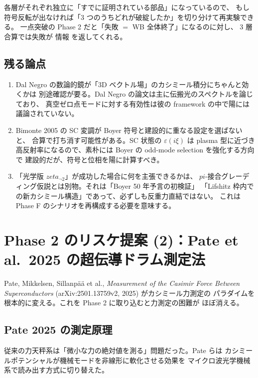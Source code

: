 \documentclass[11pt,a4paper]{article}
\def\pi{pi}%
\def\zeta{zeta}%
\def\textbf#1{#1}%
\begin{document}
各層がそれぞれ独立に「すでに証明されている部品」になっているので、
もし符号反転が出なければ「3 つのうちどれが破綻したか」を切り分けて再実験できる。
一点突破の Phase 2 だと「失敗 $=$ WB 全体終了」になるのに対し、
3 層合算では失敗が \textbf{情報} を返してくれる。

\subsection{残る論点}

\begin{enumerate}
\item Dal Negro の数論的鏡が「3D ベクトル場」のカシミール積分にちゃんと効くかは
  別途確認が要る。Dal Negro の論文は主に伝搬光のスペクトルを論じており、
  真空ゼロ点モードに対する有効性は彼の framework の中で陽には議論されていない。
\item Bimonte 2005 の SC 変調が Boyer 符号と建設的に重なる設定を選ばないと、
  合算で打ち消す可能性がある。SC 状態の $\varepsilon(i\xi)$ は plasma 型に近づき
  高反射率になるので、素朴には Boyer の odd-mode selection を強化する方向で
  建設的だが、符号と位相を陽に計算すべき。
\item 「光学版 $\zeta_{\neg 2}$」が成功した場合に何を主張できるかは、
  $\pi$-接合グレーディング仮説とは別物。それは「Boyer 50 年予言の初検証」
  「Lifshitz 枠内での新カシミール構造」であって、必ずしも反重力直結ではない。
  これは Phase F のシナリオを再構成する必要を意味する。
\end{enumerate}

\section{Phase 2 のリスケ提案 (2)：Pate et al.\ 2025 の超伝導ドラム測定法}

\textbf{Pate, Mikkelsen, Sillanp\"a\"a et al., \emph{Measurement of the Casimir Force
Between Superconductors} (arXiv:2501.13759v2, 2025)} がカシミール力測定の
パラダイムを根本的に変える。これを Phase 2 に取り込むと力測定の困難が
ほぼ消える。

\subsection{Pate 2025 の測定原理}

従来の力天秤系は「微小な力の絶対値を測る」問題だった。Pate らは
\textbf{カシミールポテンシャルが機械モードを非線形に軟化させる効果}を
マイクロ波光学機械系で読み出す方式に切り替えた。
\end{document}
